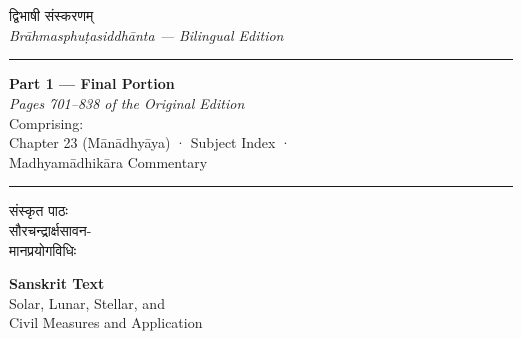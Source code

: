 \documentclass[11pt,a4paper]{article}
\newcommand{\longline}{\noindent\rule{\textwidth}{0.4pt}}
\newcommand{\dev}[1]{{\devanagarifont #1}}
\newcommand{\devbold}[1]{{\devanagarifontbold #1}}
\begin{document}
\thispagestyle{empty}
\begin{center}
\vspace*{1.5cm}

{\fontsize{12}{14}\selectfont\dev{श्रीब्रह्मगुप्ताचार्य-विरचित}}\\[0.3cm]
{\fontsize{26}{30}\selectfont\devbold{ब्राह्मस्फुटसिद्धान्तः}}\\[0.4cm]
{\Large\devbold{द्विभाषी संस्करणम्}}\\[0.6cm]
{\large\textit{Brāhmasphuṭasiddhānta — Bilingual Edition}}

\vspace{1.2cm}

\longline

\vspace{0.6cm}

{\LARGE\textbf{Part 1 — Final Portion}}\\[0.4cm]
{\large\textit{Pages 701--838 of the Original Edition}}\\[0.3cm]
{\small Comprising:}\\[0.2cm]
{\normalsize Chapter 23 (Mānādhyāya) · Subject Index ·}\\[0.1cm]
{\normalsize Madhyamādhikāra Commentary}

\vspace{0.6cm}

\longline

\vspace{1cm}

\begin{paracol}{2}
\begin{leftcolumn*}
\begin{center}
{\large\devbold{संस्कृत पाठः}}\\[0.3cm]
{\small\dev{सौरचन्द्रार्क्षसावन-\\मानप्रयोगविधिः}}
\end{center}
\end{leftcolumn*}
\begin{rightcolumn}
\begin{center}
{\large\textbf{Sanskrit Text}}\\[0.3cm]
{\small Solar, Lunar, Stellar, and\\Civil Measures and Application}
\end{center}
\end{rightcolumn}
\end{paracol}


\end{center}
\end{document}
